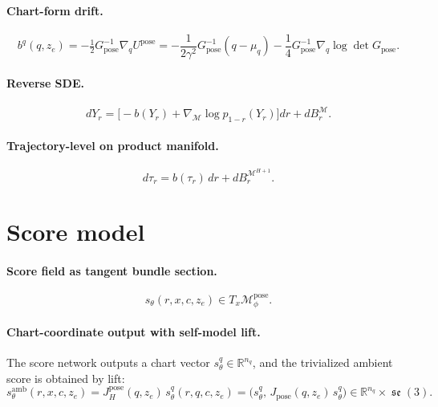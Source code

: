 \documentclass[11pt,a4paper]{article}
\DeclareMathOperator{\se}{\mathfrak{se}}
\newcommand{\R}{\mathbb{R}}
\newcommand{\Mset}{\mathcal{M}}
\newcommand{\Mpose}{\mathcal{M}_\phi^{\text{pose}}}
\newcommand{\Jpose}{J_{\text{pose}}}
\begin{document}
\paragraph{Chart-form drift.}
\begin{equation}
b^q(q, z_e) = -\tfrac{1}{2} G_{\text{pose}}^{-1} \nabla_q U^{\text{pose}} = -\frac{1}{2 \gamma^2} G_{\text{pose}}^{-1}(q - \mu_q) - \frac{1}{4} G_{\text{pose}}^{-1} \nabla_q \log \det G_{\text{pose}}.
\end{equation}

\paragraph{Reverse SDE.}
\begin{equation}
dY_r = \bigl[ -b(Y_r) + \nabla_{\Mset} \log p_{1-r}(Y_r) \bigr] dr + dB^{\Mset}_r.
\end{equation}

\paragraph{Trajectory-level on product manifold.}
\begin{equation}
d\tau_r = b(\tau_r) \, dr + dB^{\Mset^{H+1}}_r.
\end{equation}

\section{Score model}

\paragraph{Score field as tangent bundle section.}
\begin{equation}
s_\theta(r, x, c, z_e) \in T_x \Mpose.
\end{equation}

\paragraph{Chart-coordinate output with self-model lift.} The score network outputs a chart vector $s_\theta^q \in \R^{n_q}$, and the trivialized ambient score is obtained by lift:
\begin{equation}
s_\theta^{\text{amb}}(r, x, c, z_e) = J_H^{\text{pose}}(q, z_e) \, s_\theta^q(r, q, c, z_e) = \bigl(s_\theta^q, \, \Jpose(q, z_e) \, s_\theta^q\bigr) \in \R^{n_q} \times \se(3).
\end{equation}
\end{document}
